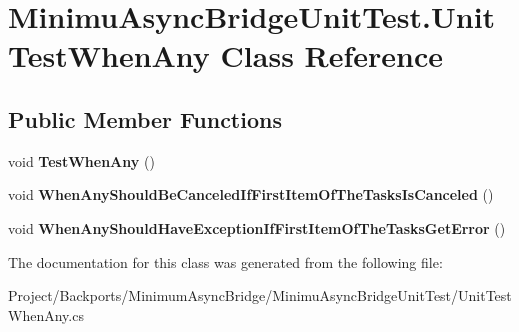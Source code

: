 \hypertarget{class_minimu_async_bridge_unit_test_1_1_unit_test_when_any}{}\section{Minimu\+Async\+Bridge\+Unit\+Test.\+Unit\+Test\+When\+Any Class Reference}
\label{class_minimu_async_bridge_unit_test_1_1_unit_test_when_any}
\subsection*{Public Member Functions}
\begin{DoxyCompactItemize}
\item 
\mbox{\label{class_minimu_async_bridge_unit_test_1_1_unit_test_when_any_a1a634fcd13d3cc0689ebb5880498926e}} 
void {\bfseries Test\+When\+Any} ()
\item 
\mbox{\label{class_minimu_async_bridge_unit_test_1_1_unit_test_when_any_a090bbe17edecbf670ea639fdd40fbf97}} 
void {\bfseries When\+Any\+Should\+Be\+Canceled\+If\+First\+Item\+Of\+The\+Tasks\+Is\+Canceled} ()
\item 
\mbox{\label{class_minimu_async_bridge_unit_test_1_1_unit_test_when_any_a4d62e663384162142fa3fdcf8ee49a0b}} 
void {\bfseries When\+Any\+Should\+Have\+Exception\+If\+First\+Item\+Of\+The\+Tasks\+Get\+Error} ()
\end{DoxyCompactItemize}


The documentation for this class was generated from the following file\+:\begin{DoxyCompactItemize}
\item 
Project/\+Backports/\+Minimum\+Async\+Bridge/\+Minimu\+Async\+Bridge\+Unit\+Test/Unit\+Test\+When\+Any.\+cs\end{DoxyCompactItemize}
